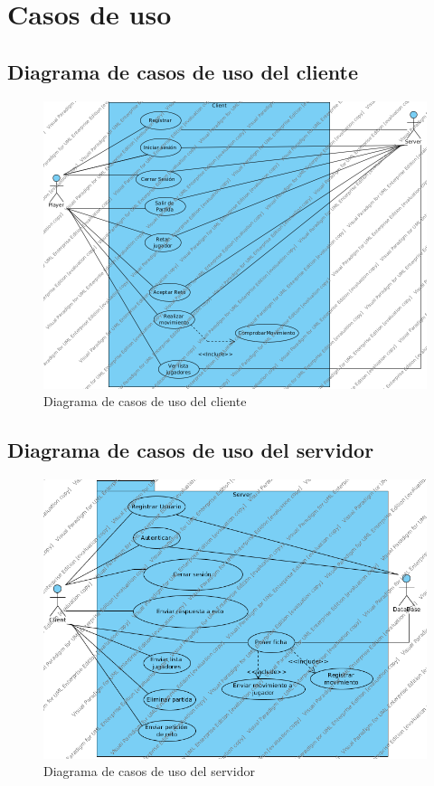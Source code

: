 \section{Casos de uso} 
\subsection{Diagrama de casos de uso del cliente}
 \begin{figure}[h]
 \centering
 \includegraphics[scale=0.6]{img/cdu_Cliente.png}
 \caption{Diagrama de casos de uso del cliente}
 \label{cdu_cliente}
 \end{figure}
\clearpage
\subsection{Diagrama de casos de uso del servidor}
 \begin{figure}[h]
 \centering
 \includegraphics[scale=0.7]{img/cdu_Servidor.png}
 \caption{Diagrama de casos de uso del servidor}
 \label{cdu_servidor}
 \end{figure}
